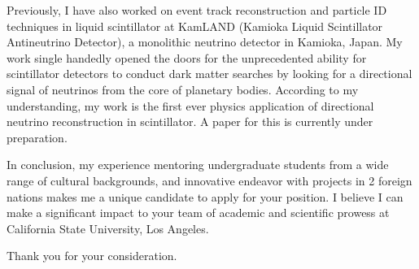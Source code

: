 \documentclass[11pt,a4paper,sans]{moderncv}        %
\begin{document}
Previously, I have also worked on event track reconstruction and particle ID
techniques in liquid scintillator at KamLAND (Kamioka Liquid Scintillator
Antineutrino Detector), a monolithic neutrino detector in Kamioka, Japan. My
work single handedly opened the doors for the unprecedented ability for
scintillator detectors to conduct dark matter searches by looking for a
directional signal of neutrinos from the core of planetary bodies. According to
my understanding, my work is the first ever physics application of directional
neutrino reconstruction in scintillator. A paper for this is currently under
preparation.

In conclusion, my experience mentoring undergraduate students from a wide range
of cultural backgrounds, and innovative endeavor with projects in 2 foreign
nations makes me a unique candidate to apply for your position. I believe
I can make a significant impact to your team of academic and scientific
prowess at California State University, Los Angeles.

Thank you for your consideration.

\makeletterclosing
\end{document}
